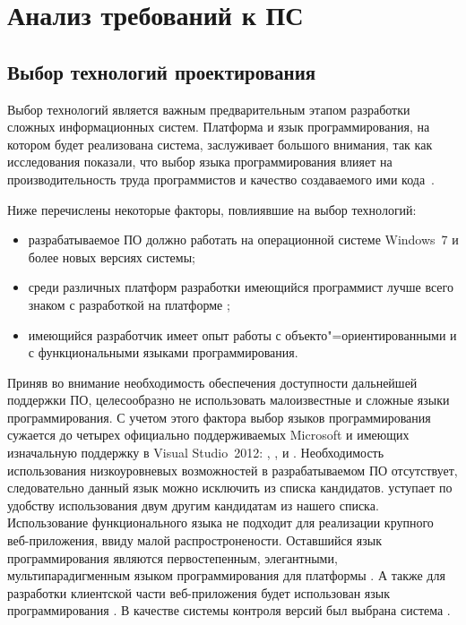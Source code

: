 \lstset{style=fsharpstyle}

\section{Анализ требований к ПС} 
\label{sec:practice:technology_used}

\subsection{Выбор технологий проектирования}
\label{sec:practice:technology_used:tech}
    
Выбор технологий является важным предварительным этапом разработки сложных информационных систем.
Платформа и язык программирования, на котором будет реализована система, заслуживает большого внимания, так как исследования показали, что выбор языка программирования влияет на производительность труда программистов и качество создаваемого ими кода~\cite[c.~59]{mcconnell_2005}.

Ниже перечислены некоторые факторы, повлиявшие на выбор технологий:
\begin{itemize}
\item разрабатываемое ПО должно работать на операционной системе Windows~7 и более новых версиях системы;
\item среди различных платформ разработки имеющийся программист лучше всего знаком с разработкой на платформе \dotnet{};
\item имеющийся разработчик имеет опыт работы с объекто"=ориентированными и с функциональными языками программирования.
\end{itemize}

Приняв во внимание необходимость обеспечения доступности дальнейшей поддержки ПО, целесообразно не использовать малоизвестные и сложные языки программирования.
С учетом этого фактора выбор языков программирования сужается до четырех официально поддерживаемых Microsoft и имеющих изначальную поддержку в Visual Studio~2012: \cppcli{}, \csharp{}, \vbnet{} и \fsharp{}.
Необходимость использования низкоуровневых возможностей \cppcli{} в разрабатываемом ПО отсутствует, следовательно данный язык можно исключить из списка кандидатов.
\vbnet{} уступает по удобству использования двум другим кандидатам из нашего списка.
Использование функционального языка \fsharp{} не подходит для реализации крупного веб-приложения, ввиду малой распростронености.
Оставшийся язык программирования \csharp{} являются первостепенным, элегантными, мультипарадигменным языком программирования для платформы \dotnet.
А также для разработки клиентской части веб-приложения будет использован язык программирования \js{}.
В качестве системы контроля версий был выбрана система \git{}.

